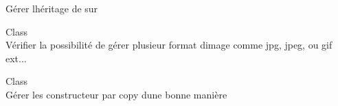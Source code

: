 \begin{DoxyRefList}
Gérer l\textquotesingle{}héritage de  sur   
\item[Class \doxylink{classTexture}{Texture} ]\hfill \\
\label{todo__todo000014}%
%
Vérifier la possibilité de gérer plusieur format d\textquotesingle{}image comme jpg, jpeg, ou gif ext...  
\item[Class \doxylink{classVector2}{Vector2\texorpdfstring{$<$}{<} T \texorpdfstring{$>$}{>}} ]\hfill \\
\label{todo__todo000004}%
%
Gérer les constructeur par copy d\textquotesingle{}une bonne manière 
\end{DoxyRefList}